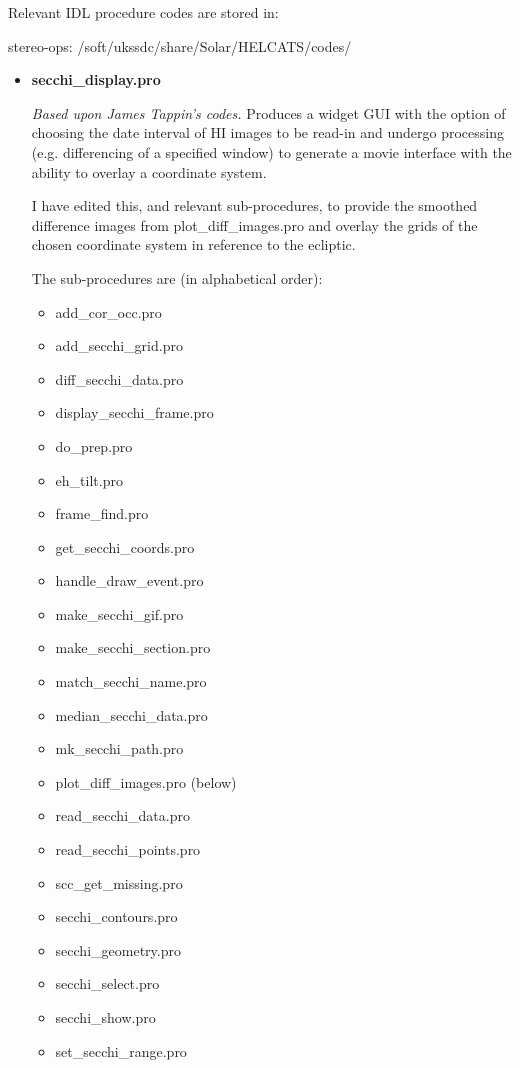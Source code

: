 \documentclass[12pt, a4paper, oneside]{article}
\begin{document}
Relevant IDL procedure codes are stored in:
 
stereo-ops: /soft/ukssdc/share/Solar/HELCATS/codes/

\begin{itemize}
\item {\bf secchi\_display.pro}

\emph{Based upon James Tappin's codes.} Produces a widget GUI with the option of choosing the date interval of HI images to be read-in and undergo processing (e.g. differencing of a specified window) to generate a movie interface with the ability to overlay a coordinate system. 

I have edited this, and relevant sub-procedures, to provide the smoothed difference images from plot\_diff\_images.pro and overlay the grids of the chosen coordinate system in reference to the ecliptic.

The sub-procedures are (in alphabetical order):

\begin{multicols}{3}
\begin{itemize}
\item add\_cor\_occ.pro
\item add\_secchi\_grid.pro
\item diff\_secchi\_data.pro	
\item display\_secchi\_frame.pro  	     
\item do\_prep.pro		  
\item eh\_tilt.pro		  
\item frame\_find.pro	   
\item get\_secchi\_coords.pro    
\item handle\_draw\_event.pro    
\item make\_secchi\_gif.pro	   
\item make\_secchi\_section.pro  
\item match\_secchi\_name.pro   
\item median\_secchi\_data.pro  
\item mk\_secchi\_path.pro	   
\item plot\_diff\_images.pro    (below)
\item read\_secchi\_data.pro    
\item read\_secchi\_points.pro  
\item scc\_get\_missing.pro	   
\item secchi\_contours.pro
\item secchi\_geometry.pro
\item secchi\_select.pro
\item secchi\_show.pro
\item set\_secchi\_range.pro


\end{itemize}
\end{multicols}
\end{itemize}
\end{document}
